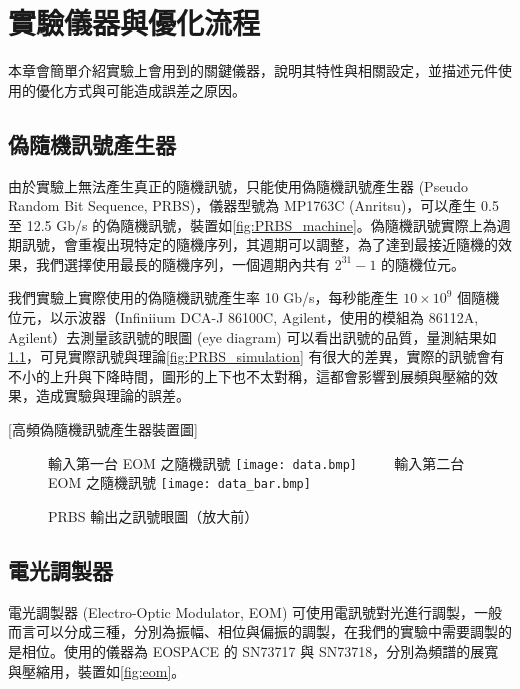 \documentclass[class=NCU_thesis, crop=false]{standalone}
\begin{document}
\chapter{實驗儀器與優化流程}
本章會簡單介紹實驗上會用到的關鍵儀器，說明其特性與相關設定，並描述元件使用的優化方式與可能造成誤差之原因。

\section{偽隨機訊號產生器}
由於實驗上無法產生真正的隨機訊號，只能使用偽隨機訊號產生器 (Pseudo Random Bit Sequence, PRBS)，儀器型號為 MP1763C (Anritsu)，可以產生 0.5 至 12.5 Gb/s 的偽隨機訊號，裝置如\cref{fig:PRBS_machine}。偽隨機訊號實際上為週期訊號，會重複出現特定的隨機序列，其週期可以調整，為了達到最接近隨機的效果，我們選擇使用最長的隨機序列，一個週期內共有 $2^{31}-1$ 的隨機位元。

我們實驗上實際使用的偽隨機訊號產生率 10 Gb/s，每秒能產生 $10\times 10^{9}$ 個隨機位元，以示波器（Infiniium DCA-J 86100C, Agilent，使用的模組為 86112A, Agilent）去測量該訊號的眼圖 (eye diagram) 可以看出訊號的品質，量測結果如\cref{fig:prbs_eye}，可見實際訊號與理論\cref{fig:PRBS_simulation} 有很大的差異，實際的訊號會有不小的上升與下降時間，圖形的上下也不太對稱，這都會影響到展頻與壓縮的效果，造成實驗與理論的誤差。

[高頻偽隨機訊號產生器裝置圖]


\begin{figure}[!hbt]
    \centering
    \subcaptionbox
        {輸入第一台 EOM 之隨機訊號
        \label{fig:subfig_fig1}}
        {\texttt{[image: data.bmp]}}
    ~~~~
    \subcaptionbox
        {輸入第二台 EOM 之隨機訊號
        \label{fig:subfig_fig2}}
        {\texttt{[image: data\_bar.bmp]}}
    \caption{PRBS 輸出之訊號眼圖（放大前）}
    \label{fig:prbs_eye}
\end{figure}

\section{電光調製器}

電光調製器 (Electro-Optic Modulator, EOM) 可使用電訊號對光進行調製，一般而言可以分成三種，分別為振幅、相位與偏振的調製，在我們的實驗中需要調製的是相位。使用的儀器為 EOSPACE 的 SN73717 與 SN73718，分別為頻譜的展寬與壓縮用，裝置如\cref{fig:eom}。
\end{document}
